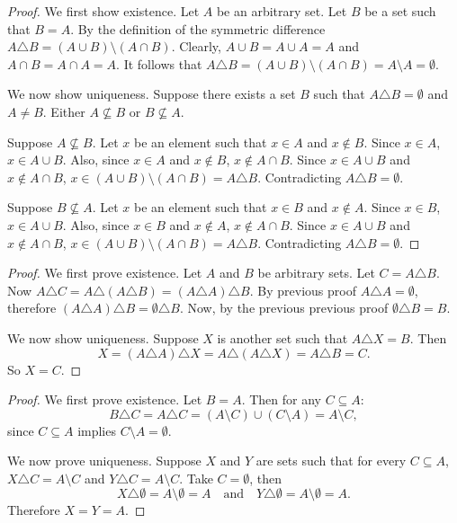 \begin{proof}
    We first show existence.
    Let $A$ be an arbitrary set.
    Let $B$ be a set such that $B = A$.
    By the definition of the symmetric difference 
    $A \triangle B = (A \cup B) \setminus (A \cap B)$.
    Clearly, $A \cup B = A \cup A = A$ and $A \cap B = A \cap A = A$.
    It follows that $A \triangle B = (A \cup B) \setminus (A \cap B) = A \setminus A = \emptyset$.

    We now show uniqueness. Suppose there exists a set $B$ such that $A \triangle B
        = \emptyset$ and $A \not = B$. Either $A \not \subseteq B$ or $B \not \subseteq
        A$.

    Suppose $A \not \subseteq B$. Let $x$ be an element such that $x \in A$ and $x
        \not \in B$. Since $x \in A$, $x \in A \cup B$. Also, since $x \in A$ and $x
        \not \in B$, $x \not \in A \cap B$. Since $x \in A \cup B$ and $x \not \in A
        \cap B$, $x \in (A \cup B) \setminus (A \cap B) = A \triangle B$. Contradicting
    $A \triangle B = \emptyset$.

    Suppose $B \not \subseteq A$. Let $x$ be an element such that $x \in B$ and $x
        \not \in A$. Since $x \in B$, $x \in A \cup B$. Also, since $x \in B$ and $x
        \not \in A$, $x \not \in A \cap B$. Since $x \in A \cup B$ and $x \not \in A
        \cap B$, $x \in (A \cup B) \setminus (A \cap B) = A \triangle B$. Contradicting
    $A \triangle B = \emptyset$.
\end{proof}

\begin{proof}
    We first prove existence.
    Let $A$ and $B$ be arbitrary sets.
    Let $C = A \triangle B$.
    Now $A \triangle C = A \triangle (A \triangle B) = (A \triangle A) \triangle B$.
    By previous proof $A \triangle A = \emptyset$,
    therefore $(A \triangle A) \triangle B = \emptyset \triangle B$.
    Now, by the previous previous proof $\emptyset \triangle B = B$.

    We now show uniqueness. Suppose $X$ is another set such that $A \triangle X =
        B$. Then
    \[
        X  = (A \triangle A) \triangle X = A \triangle (A \triangle X) = A \triangle B = C.
    \]
    So $X = C$.
\end{proof}

\begin{proof}
    We first prove existence. Let $B = A$.
    Then for any $C \subseteq A$:
    \[
        B \triangle C = A \triangle C = (A \setminus C) \cup (C \setminus A) = A \setminus C,
    \]
    since $C \subseteq A$ implies $C \setminus A = \emptyset$.

    We now prove uniqueness. Suppose $X$ and $Y$ are sets such that for every $C
        \subseteq A$, $X \triangle C = A \setminus C$ and $Y \triangle C = A \setminus
        C$. Take $C = \emptyset$, then
    \[
        X \triangle \emptyset = A \setminus \emptyset = A \quad \text{and} \quad
        Y \triangle \emptyset = A \setminus \emptyset = A.
    \]
    Therefore $X = Y = A$.
\end{proof}

